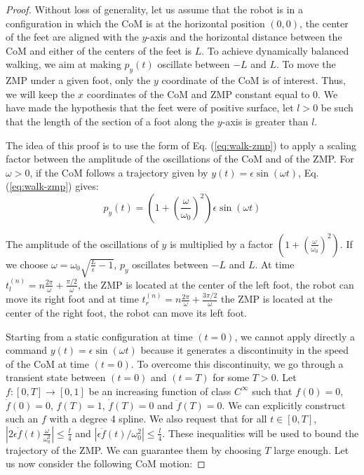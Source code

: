 \documentclass{article}
\begin{document}
\begin{proof}
Without loss of generality, let us assume that the robot is in a configuration
in which the CoM is at the horizontal position $(0,0)$, the center of the feet are 
aligned with the $y$-axis and the horizontal distance between the CoM and either of the centers
of the feet is $L$. To achieve dynamically balanced walking, we aim at making
$p_y(t)$ oscillate  between $-L$ and $L$. To move the ZMP  under a
given foot, only  the $y$ coordinate of the CoM  is of interest. Thus,
we will keep the $x$ coordinates  of the CoM and ZMP constant equal to
$0$. We have made the hypothesis that the feet were of positive surface,
let $l>0$ be such that the length of the section of a foot along the 
$y$-axis is greater than $l$.

The idea of this proof is to use the form of Eq. (\ref{eq:walk-zmp}) to
apply a  scaling factor between  the amplitude of the  oscillations of
the CoM and of the ZMP. For $\omega >0$, if the CoM follows a trajectory given
by  $y(t) = \epsilon \sin(\omega t)$,  Eq. (\ref{eq:walk-zmp}) gives:
\[
p_y(t) =
(1+\left(\frac{\omega}{\omega_0}\right)^2)\epsilon\sin(\omega t)
\]

The
amplitude  of  the oscillations  of  $y$  is  multiplied by  a  factor
$(1+\left(\frac{\omega}{\omega_0}\right)^2)$.  If we choose  $\omega =
\omega_0 \sqrt{\frac{L}{\epsilon} -1}$,  $p_y$ oscillates between $-L$
and    $L$.   At    time   $t_l^{(n)}    =    n\frac{2\pi}{\omega}   +
\frac{\pi/2}{\omega}$, the  ZMP is located  at the center of  the left
foot,  the robot  can move  its right  foot and  at time  $t_r^{(n)} =
n\frac{2\pi}{\omega}  + \frac{3\pi/2}{\omega}$ the  ZMP is  located at
the center of the right foot, the robot can move its left foot.

Starting from a static configuration at time $(t=0)$, we cannot apply
directly  a  command  $y(t)  =  \epsilon \sin(\omega  t)$  because  it
generates  a discontinuity  in the  speed of  the CoM  at time $(t=0)$. To
overcome this  discontinuity, we go through a  transient state between
$(t=0)$ and  $(t=T)$ for some  $T >0$. Let  $f:[0,T] \rightarrow
[0,1]$  be an  increasing function of class $C^\infty$  such  that  $f(0)  =  0$,
$\dot{f}(0) = 0$, $f(T) =  1$, $\dot{f}(T) = 0$ and $\ddot{f}(T)
=  0$.  We can explicitly  construct  such  an $f$   with  a degree  4
spline.   We   also   request   that   for  all   $t   \in   [0,T]$,
$|2\epsilon\dot{f}(t)\frac{\omega}{\omega_0^2}|   \leq  \frac{l}{4}$
and   $|\epsilon\ddot{f}(t)/\omega_0^2|  \leq   \frac{l}{4}$.  These
inequalities  will be  used  to bound  the  trajectory of  the  ZMP. We  can
guarantee them by  choosing $T$ large enough. Let  us now consider the
following CoM motion:


\end{proof}
\end{document}
